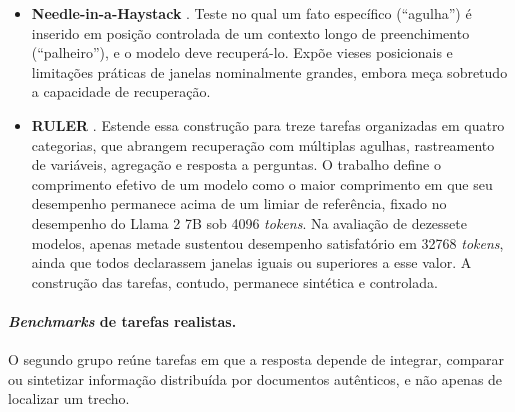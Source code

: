 \begin{itemize}[leftmargin=1.6em]
\item \textbf{Needle-in-a-Haystack} \cite{kamradt2023needle}. Teste no qual um fato específico (``agulha'') é inserido em posição controlada de um contexto longo de preenchimento (``palheiro''), e o modelo deve recuperá-lo. Expõe vieses posicionais e limitações práticas de janelas nominalmente grandes, embora meça sobretudo a capacidade de recuperação.

\item \textbf{RULER} \cite{hsieh2024ruler}. Estende essa construção para treze tarefas organizadas em quatro categorias, que abrangem recuperação com múltiplas agulhas, rastreamento de variáveis, agregação e resposta a perguntas. O trabalho define o comprimento efetivo de um modelo como o maior comprimento em que seu desempenho permanece acima de um limiar de referência, fixado no desempenho do Llama 2 7B sob 4096 \textit{tokens}. Na avaliação de dezessete modelos, apenas metade sustentou desempenho satisfatório em 32768 \textit{tokens}, ainda que todos declarassem janelas iguais ou superiores a esse valor. A construção das tarefas, contudo, permanece sintética e controlada.
\end{itemize}

\paragraph{\textit{Benchmarks} de tarefas realistas.}
O segundo grupo reúne tarefas em que a resposta depende de integrar, comparar ou sintetizar informação distribuída por documentos autênticos, e não apenas de localizar um trecho.

